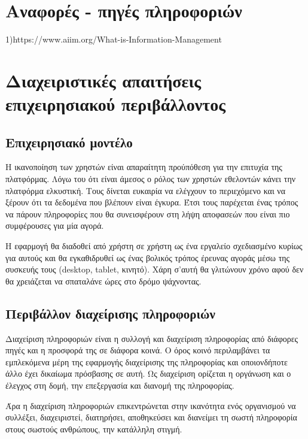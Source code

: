 \documentclass[12pt, oneside, a4paper]{report}
\begin{document}
\section{Αναφορές - πηγές πληροφοριών}
1)https://www.aiim.org/What-is-Information-Management

\section{Διαχειριστικές απαιτήσεις επιχειρησιακού περιβάλλοντος}

\subsection{Επιχειρησιακό μοντέλο}

\hspace{0.6cm}Η ικανοποίηση των χρηστών είναι απαραίτητη προύπόθεση για την επιτυχία της πλατφόρμας.
Λόγω του ότι είναι άμεσος ο ρόλος των χρηστών εθελοντών κάνει την πλατφόρμα ελκυστική. Τους δίνεται ευκαιρία να ελέγχουν το περιεχόμενο και να ξέρουν ότι τα δεδομένα που βλέπουν είναι έγκυρα. Έτσι τους παρέχεται ένας τρόπος να πάρουν πληροφορίες που θα συνεισφέρουν στη λήψη αποφασεών που είναι πιο συμφέρουσες για μία αγορά. 

\hspace{0.6cm}Η εφαρμογή θα διαδοθεί από χρήστη σε χρήστη ως ένα εργαλείο σχεδιασμένο κυρίως για αυτούς και θα εγκαθιδρυθεί ως ένας βολικός τρόπος έρευνας αγοράς μέσω της συσκευής τους (desktop, tablet, κινητό). Χάρη σ'αυτή θα γλιτώνουν χρόνο αφού δεν θα χρειάζεται να σπαταλάνε ώρες στο δρόμο ψάχνοντας.

\subsection{Περιβάλλον διαχείρισης πληροφοριών}
\hspace{0.6cm}Διαχείριση πληροφοριών είναι η συλλογή και διαχείριση πληροφορίας από διάφορες πηγές και η προσφορά της σε διάφορα κοινά. Ο όρος κοινό περιλαμβάνει τα εμπλεκόμενα μέρη της εφαρμογής διαχείρισης της πληροφορίας και οποιονδήποτε άλλο έχει δικαίωμα πρόσβασης σε αυτή. Ως διαχείριση ορίζεται η οργάνωση και ο έλεγχος στη δομή, την επεξεργασία και διανομή της πληροφορίας.

\hspace{0.6cm}Άρα η διαχείριση πληροφοριών επικεντρώνεται στην ικανότητα ενός οργανισμού να συλλέξει, διαχειριστεί, διατηρήσει, αποθηκεύσει και διανείμει τη σωστή πληροφορία στους σωστούς ανθρώπους, την κατάλληλη στιγμή.
\end{document}
